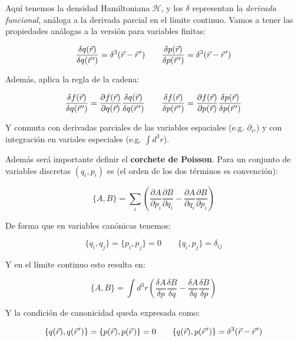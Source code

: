Aquí tenemos la densidad Hamiltoniana $\mathcal{H}$, y los $\delta$ representan la \textit{derivada funcional}, análoga a la derivada parcial en el límite continuo. Vamos a tener las propiedades análogas a la versión para variables finitas:

\begin{equation}
	\frac{\delta q(\vec r)}{\delta q(\pvec r')} = \delta^3(\vec r - \pvec r') \qquad \frac{\delta p(\vec r)}{\delta p(\pvec r')} = \delta^3(\vec r - \pvec r')
\end{equation}

Además, aplica la regla de la cadena:

\begin{equation}
	\frac{\delta f(\vec r)}{\delta q(\pvec r')} = \frac{\partial f(\vec r)}{\partial q(\vec r)} \frac{\delta q(\vec r)}{\delta q(\pvec r')} \qquad \frac{\delta f(\vec r)}{\delta p(\pvec r')} = \frac{\partial f(\vec r)}{\partial p(\vec r)} \frac{\delta p(\vec r)}{\delta p(\pvec r')}
\end{equation}

Y conmuta con derivadas parciales de las variables espaciales (e.g. $\partial_{r^i}$) y con integración en variales especiales (e.g. $\int d^3r$).


Además será importante definir el \textbf{corchete de Poisson}. Para un conjunto de variables discretas $(q_i,p_i)$ es (el orden de los dos términos es convención):

\begin{equation}
	\{A, B\} = \sum_i\left(\frac{\partial A}{\partial p_i}\frac{\partial B}{\partial q_i} - \frac{\partial A}{\partial q_i}\frac{\partial B}{\partial p_i}\right)
\end{equation}

De forma que en variables canónicas tenemos:

\begin{equation}
	\{q_i,q_j\}=\{p_i,p_j\}=0 \qquad \{q_i,p_j\} = \delta_{ij}
\end{equation}

Y en el límite continuo esto resulta en:

\begin{equation}
	\{A, B\} = \int d^3r \left(\frac{\delta A}{\delta p}\frac{\delta B}{\delta q} - \frac{\delta A}{\delta q}\frac{\delta B}{\delta p}\right)
\end{equation}

Y la condición de canonicidad queda expresada como:

\begin{equation}
	\{q(\vec r),q(\pvec r')\}=\{p(\vec r),p(\pvec r)\}=0 \qquad \{q(\vec r),p(\pvec r')\} = \delta^3(\vec r- \pvec r')
\end{equation}

